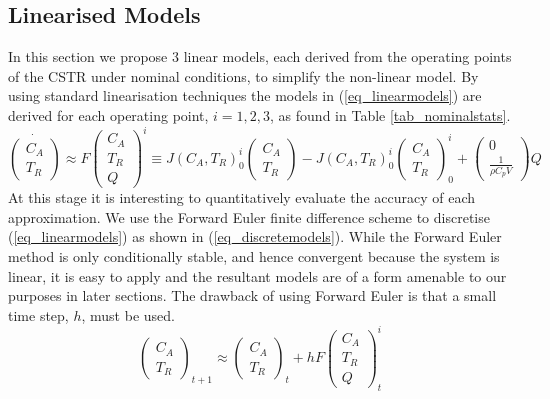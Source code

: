 \documentclass[../masters.tex]{subfiles}
\begin{document}
\subsection{Linearised Models}
In this section we propose 3 linear models, each derived from the operating points of the CSTR under nominal conditions, to simplify the non-linear model. By using standard linearisation techniques the models in (\ref{eq_linearmodels}) are derived for each operating point, $i=1,2,3$, as found in Table \ref{tab_nominalstats}.
\begin{equation}
\dot{\begin{pmatrix}
C_A \\ T_R
\end{pmatrix}} \approx F\begin{pmatrix}
C_A \\ T_R \\ Q
\end{pmatrix}^i \equiv J(C_A, T_R)^i_0\begin{pmatrix}
C_A \\ T_R
\end{pmatrix} - J(C_A, T_R)^i_0\begin{pmatrix}
{C_A} \\ T_R
\end{pmatrix}_0^i + \begin{pmatrix}
0 \\ \frac{1}{\rho C_p V}
\end{pmatrix}Q
\label{eq_linearmodels}
\end{equation}
At this stage it is interesting to quantitatively evaluate the accuracy of each approximation. We use the Forward Euler finite difference scheme to discretise (\ref{eq_linearmodels}) as shown in (\ref{eq_discretemodels}). While the Forward Euler method is only conditionally stable, and hence convergent because the system is linear, it is easy to apply and the resultant models are of a form amenable to our purposes in later sections. The drawback of using Forward Euler is that a small time step, $h$, must be used.
\begin{equation}
\begin{pmatrix}
C_A \\ T_R
\end{pmatrix}_{t+1} \approx  \begin{pmatrix}
C_A \\ T_R
\end{pmatrix}_{t} + h F\begin{pmatrix}
C_A \\ T_R \\ Q 
\end{pmatrix}_t^i
\label{eq_discretemodels}
\end{equation}
\end{document}
